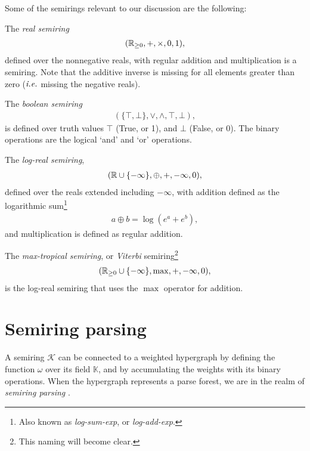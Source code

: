   Some of the semirings relevant to our discussion are the following:
  \begin{example}{}
    The \textit{real semiring}
    \begin{align*}
      ( \mathbb{R}_{\geq 0}, +, \times, 0, 1 ),
    \end{align*}
    defined over the nonnegative reals, with regular addition and multiplication is a semiring. Note that the additive inverse is missing for all elements greater than zero ($\emph{i.e.}$ missing the negative reals).
  \end{example}

  \begin{example}{}
    The \textit{boolean semiring}
    \begin{align*}
      ( \{ \top, \bot \}, \vee, \wedge, \top, \bot  ),
    \end{align*}
    is defined over truth values $\top$ (True, or 1), and $\bot$ (False, or 0). The binary operations are the logical `and' and `or' operations.
  \end{example}

  \begin{example}{}
    The \textit{log-real semiring},
    \begin{align*}
      ( \mathbb{R} \cup \{ - \infty \}, \oplus, +, -\infty, 0 ),
    \end{align*}
    defined over the reals extended including $-\infty$, with addition defined as the logarithmic sum\footnote{Also known as \textit{log-sum-exp}, or \textit{log-add-exp}.}
    \begin{align*}
      a \oplus b = \log( e^{a} + e^{b} ),
    \end{align*}
   and multiplication is defined as regular addition.
  \end{example}

  \begin{example}{}
    The \textit{max-tropical semiring}, or \textit{Viterbi} semiring\footnote{This naming will become clear.}
    \begin{align*}
      ( \mathbb{R}_{\geq 0} \cup \{ -\infty \}, \max, +, -\infty, 0 ),
    \end{align*}
    is the log-real semiring that uses the $\max$ operator for addition.
  \end{example}

\section{Semiring parsing}
  A semiring $\mathcal{K}$ can be connected to a weighted hypergraph by defining the function $\omega$ over its field $\mathbb{K}$, and by accumulating the weights with its binary operations. When the hypergraph represents a parse forest, we are in the realm of \textit{semiring parsing} \citep{goodman1999semiring}.

